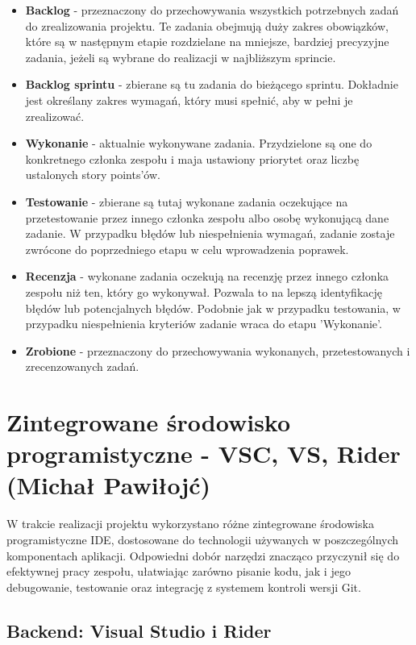 \begin{itemize}
    \item \textbf{Backlog} - przeznaczony do przechowywania wszystkich potrzebnych zadań do zrealizowania projektu. Te zadania obejmują duży zakres obowiązków, które są w następnym etapie rozdzielane na mniejsze, bardziej precyzyjne zadania, jeżeli są wybrane do realizacji w najbliższym sprincie.
    \item \textbf{Backlog sprintu} - zbierane są tu zadania do bieżącego sprintu. Dokładnie jest określany zakres wymagań, który musi spełnić, aby w pełni je zrealizować.
    \item \textbf{Wykonanie} - aktualnie wykonywane zadania. Przydzielone są one do konkretnego członka zespołu i maja ustawiony priorytet oraz liczbę ustalonych story points'ów.
    \item \textbf{Testowanie} - zbierane są tutaj wykonane zadania oczekujące na przetestowanie przez innego członka zespołu albo osobę wykonującą dane zadanie. W przypadku błędów lub niespełnienia wymagań, zadanie zostaje zwrócone do poprzedniego etapu w celu wprowadzenia poprawek.
    \item \textbf{Recenzja} - wykonane zadania oczekują na recenzję przez innego członka zespołu niż ten, który go wykonywał. Pozwala to na lepszą identyfikację błędów lub potencjalnych błędów. Podobnie jak w przypadku testowania, w przypadku niespełnienia kryteriów zadanie wraca do etapu 'Wykonanie'.
    \item \textbf{Zrobione} - przeznaczony do przechowywania wykonanych, przetestowanych i zrecenzowanych zadań.
\end{itemize}

\section{Zintegrowane środowisko programistyczne - VSC, VS, Rider (Michał Pawiłojć)}

W trakcie realizacji projektu wykorzystano różne zintegrowane środowiska programistyczne IDE, dostosowane do technologii używanych w poszczególnych komponentach aplikacji. Odpowiedni dobór narzędzi znacząco przyczynił się do efektywnej pracy zespołu, ułatwiając zarówno pisanie kodu, jak i jego debugowanie, testowanie oraz integrację z systemem kontroli wersji Git.

\subsection{Backend: Visual Studio i Rider}

